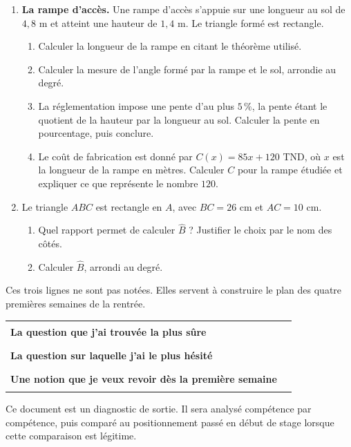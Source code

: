 \documentclass[10pt,a4paper]{article}
\begin{document}
\needspace{68mm}\par\vspace{3mm}
\begin{enumerate}
\needspace{22mm}
\item[\textbf{C1.}] \textbf{La rampe d'accès.} Une rampe d'accès s'appuie sur une longueur au sol de $4{,}8$ m
et atteint une hauteur de $1{,}4$ m. Le triangle formé est rectangle.
\begin{enumerate}
\item Calculer la longueur de la rampe en citant le théorème utilisé.
\item Calculer la mesure de l'angle formé par la rampe et le sol, arrondie au degré.
\item La réglementation impose une pente d'au plus $5\,\%$, la pente étant le quotient de la hauteur par la
longueur au sol. Calculer la pente en pourcentage, puis conclure.
\item Le coût de fabrication est donné par $C(x) = 85x + 120$ TND, où $x$ est la longueur de la rampe en mètres.
Calculer $C$ pour la rampe étudiée et expliquer ce que représente le nombre $120$.
\end{enumerate}
\par\vspace{1.2mm}
\needspace{22mm}
\item[\textbf{C2.}] Le triangle $ABC$ est rectangle en $A$, avec $BC = 26$ cm et $AC = 10$ cm.
\begin{enumerate}
\item Quel rapport permet de calculer $\widehat{B}$ ? Justifier le choix par le nom des côtés.
\item Calculer $\widehat{B}$, arrondi au degré.
\end{enumerate}
\par\vspace{1.2mm}
\end{enumerate}
\brouillon{\dimexpr\textheight/3\relax}
\newpage
{}
\begin{methodbox}Ces trois lignes ne sont pas notées. Elles servent à construire le plan des quatre premières semaines de la rentrée.\end{methodbox}
\par\noindent\begin{tabularx}{\linewidth}{>{\bfseries}p{62mm} X}
\toprule
La question que j'ai trouvée la plus sûre & \rule{85mm}{0.32pt} \\
La question sur laquelle j'ai le plus hésité & \rule{85mm}{0.32pt} \\
Une notion que je veux revoir dès la première semaine & \rule{85mm}{0.32pt} \\
\bottomrule\end{tabularx}
\vfill
\begin{graybox}\small Ce document est un diagnostic de sortie. Il sera analysé compétence par compétence, puis comparé au positionnement passé en début de stage lorsque cette comparaison est légitime.\end{graybox}
\end{document}
